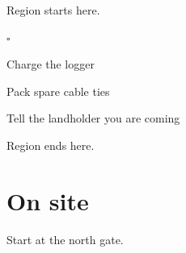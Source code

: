 \documentclass[11pt]{article}
\newenvironment{checklist}{\begin{list}{$\square$}{}}{\end{list}}
\begin{document}
Region starts here.

\begin{checklist}
\item Charge the logger
\item Pack spare cable ties
\item Tell the landholder you are coming
\end{checklist}

Region ends here.

\section{On site}
Start at the north gate.
\end{document}

